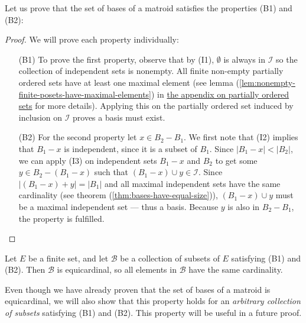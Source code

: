 Let us prove that the set of bases of a matroid satisfies the properties (B1) and (B2):
\begin{proof} We will prove each property individually:
    \begin{enumerate}
        \item[(B1)] 
            To prove the first property, observe that by (I1), $\emptyset$ is always in $\mathcal{I}$ so the collection of independent sets is nonempty. All finite non-empty partially ordered sets have at least one maximal element (see lemma (\ref{lem:nonempty-finite-posets-have-maximal-elements}) in \hyperref[sec:appendix-poset]{the appendix on partially ordered sets} for more details). Applying this on the partially ordered set induced by inclusion on $\mathcal I$ proves a basis must exist.
        \item[(B2)]
          For the second property let $x\in B_2 - B_1$. We first note that (I2) implies that $B_1 - x$ is independent, since it is a subset of $B_1$. Since $|B_1-x|<|B_2|$, we can apply (I3) on independent sets $B_1-x$ and $B_2$ to get some $y\in B_2-(B_1-x)$ such that $(B_1-x)\cup y \in\mathcal{I}$. Since $|(B_1-x) + y|=|B_1|$ and all maximal independent sets have the same cardinality (see theorem (\ref{thm:bases-have-equal-size})), $(B_1-x)\cup y$ must be a maximal independent set --- thus a basis. Because $y$ is also in $B_2-B_1$, the property is fulfilled.
    \end{enumerate}
\end{proof} 



\begin{lemma}\label{lem:basis-axioms-imply-equal-size}
    Let $E$ be a finite set, and let $\mathcal{B}$ be a collection of subsets of $E$ satisfying (B1) and (B2). Then $\mathcal{B}$ is equicardinal, so all elements in $\mathcal{B}$ have the same cardinality.
\end{lemma}

Even though we have already proven that the set of bases of a matroid is equicardinal, we will also show that this property holds for an \textit{arbitrary collection of subsets} satisfying (B1) and (B2). This property will be useful in a future proof.


